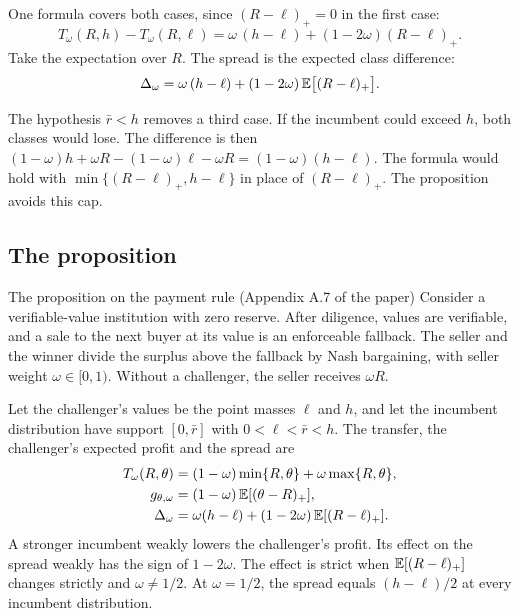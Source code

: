 One formula covers both cases, since \((R-\ell)_+=0\) in the first case:
\[
T_\omega(R,h)-T_\omega(R,\ell)=\omega\,(h-\ell)+(1-2\omega)(R-\ell)_+ .
\]
Take the expectation over \(R\). The spread is the expected class difference:
\begin{equation}\label{eq:welfare-spreadpay}
\Delta_\omega=\omega\,(h-\ell)+(1-2\omega)\,\mathbb{E}\bigl[(R-\ell)_+\bigr].
\end{equation}

\begin{watchout}
The hypothesis \(\bar r<h\) removes a third case. If the incumbent could exceed \(h\), both classes would lose. The
difference is then \((1-\omega)h+\omega R-(1-\omega)\ell-\omega R=(1-\omega)(h-\ell)\). The formula would hold with
\(\min\{(R-\ell)_+,h-\ell\}\) in place of \((R-\ell)_+\). The proposition avoids this cap.
\end{watchout}

\subsection{The proposition}\label{sec:welfare-paystatement}

\begin{paperresult}{The proposition on the payment rule (Appendix A.7 of the paper)}
Consider a verifiable-value institution with zero reserve. After diligence, values are verifiable, and a sale to the
next buyer at its value is an enforceable fallback. The seller and the winner divide the surplus above the fallback by
Nash bargaining, with seller weight \(\omega\in[0,1)\). Without a challenger, the seller receives \(\omega R\).

Let the challenger's values be the point masses \(\ell\) and \(h\), and let the incumbent distribution have support
\([0,\bar r]\) with \(0<\ell<\bar r<h\). The transfer, the challenger's expected profit and the spread are
\[
\begin{aligned}
T_\omega(R,\theta)&=(1-\omega)\min\{R,\theta\}+\omega\max\{R,\theta\},\\
g_{\theta,\omega}&=(1-\omega)\,\mathbb{E}[(\theta-R)_+],\\
\Delta_\omega&=\omega(h-\ell)+(1-2\omega)\,\mathbb{E}[(R-\ell)_+].
\end{aligned}
\]
A stronger incumbent weakly lowers the challenger's profit. Its effect on the spread weakly has the sign of
\(1-2\omega\). The effect is strict when \(\mathbb{E}[(R-\ell)_+]\) changes strictly and \(\omega\ne1/2\). At \(\omega=1/2\),
the spread equals \((h-\ell)/2\) at every incumbent distribution.
\end{paperresult}

